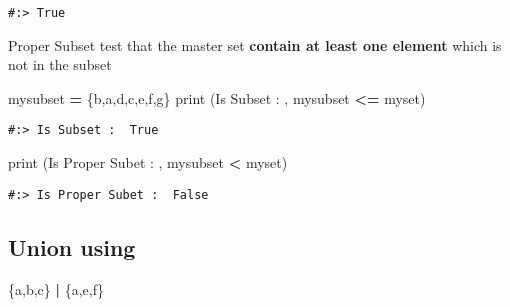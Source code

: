 \documentclass[
]{book}
\newenvironment{Shaded}{\begin{snugshade}}{\end{snugshade}}
\newcommand{\BuiltInTok}[1]{#1}
\newcommand{\NormalTok}[1]{#1}
\newcommand{\OperatorTok}[1]{\textcolor[rgb]{0.43,0.43,0.43}{\textbf{#1}}}
\newcommand{\StringTok}[1]{\textcolor[rgb]{0.5,0.5,0.5}{#1}}
\begin{document}
\begin{verbatim}
#:> True
\end{verbatim}

Proper Subset test that the master set \textbf{contain at least one element} which is not in the subset

\begin{Shaded}
\begin{Highlighting}[]
\NormalTok{mysubset }\OperatorTok{=}\NormalTok{ \{}\StringTok{\textquotesingle{}b\textquotesingle{}}\NormalTok{,}\StringTok{\textquotesingle{}a\textquotesingle{}}\NormalTok{,}\StringTok{\textquotesingle{}d\textquotesingle{}}\NormalTok{,}\StringTok{\textquotesingle{}c\textquotesingle{}}\NormalTok{,}\StringTok{\textquotesingle{}e\textquotesingle{}}\NormalTok{,}\StringTok{\textquotesingle{}f\textquotesingle{}}\NormalTok{,}\StringTok{\textquotesingle{}g\textquotesingle{}}\NormalTok{\}}
\BuiltInTok{print}\NormalTok{ (}\StringTok{\textquotesingle{}Is Subset : \textquotesingle{}}\NormalTok{, mysubset }\OperatorTok{\textless{}=}\NormalTok{ myset)}
\end{Highlighting}
\end{Shaded}

\begin{verbatim}
#:> Is Subset :  True
\end{verbatim}

\begin{Shaded}
\begin{Highlighting}[]
\BuiltInTok{print}\NormalTok{ (}\StringTok{\textquotesingle{}Is Proper Subet : \textquotesingle{}}\NormalTok{, mysubset }\OperatorTok{\textless{}}\NormalTok{ myset)}
\end{Highlighting}
\end{Shaded}

\begin{verbatim}
#:> Is Proper Subet :  False
\end{verbatim}

\hypertarget{union-using}{%
\subsection{\texorpdfstring{Union using \texttt{\textbar{}}}{Union using \textbar{}}}\label{union-using}}

\begin{Shaded}
\begin{Highlighting}[]
\NormalTok{\{}\StringTok{\textquotesingle{}a\textquotesingle{}}\NormalTok{,}\StringTok{\textquotesingle{}b\textquotesingle{}}\NormalTok{,}\StringTok{\textquotesingle{}c\textquotesingle{}}\NormalTok{\} }\OperatorTok{|}\NormalTok{ \{}\StringTok{\textquotesingle{}a\textquotesingle{}}\NormalTok{,}\StringTok{\textquotesingle{}e\textquotesingle{}}\NormalTok{,}\StringTok{\textquotesingle{}f\textquotesingle{}}\NormalTok{\}}
\end{Highlighting}
\end{Shaded}
\end{document}
